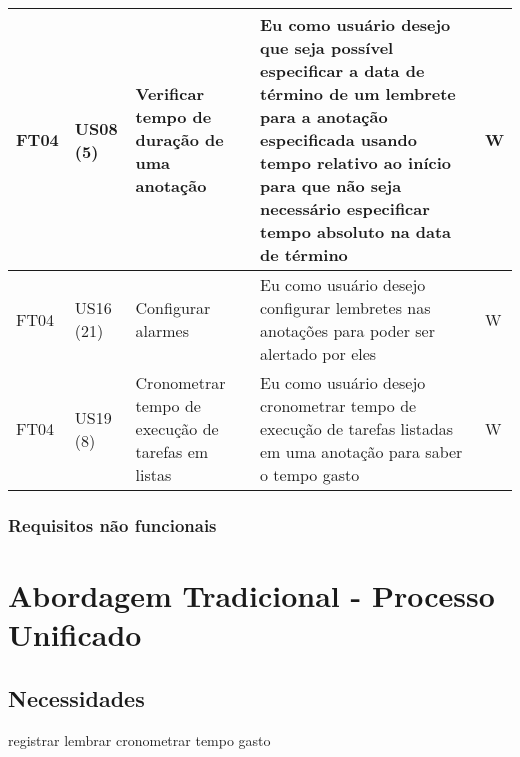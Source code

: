 \documentclass[
	12pt,				%
	oneside,			%
	a4paper,			%
	english,			%
	brazil,				%
	]{abntex2}
\begin{document}
\begin{longtable}{@{}p{}p{}p{}p{}p{}@{}}
FT04 & US08 (5) & Verificar tempo de duração de uma anotação & Eu como usuário desejo que seja possível especificar a data de término de um lembrete para a anotação especificada usando tempo relativo ao início para que não seja necessário especificar tempo absoluto na data de término & W\\ \midrule
FT04 & US16 (21) & Configurar alarmes & Eu como usuário desejo configurar lembretes nas anotações para poder ser alertado por eles & W\\ \midrule
FT04 & US19 (8) & Cronometrar tempo de execução de tarefas em listas & Eu como usuário desejo cronometrar tempo de execução de tarefas listadas em uma anotação para saber o tempo gasto & W\\ \bottomrule
\end{longtable}

\section{Requisitos não funcionais}
\begin{table}[ht]
\end{table}

\part{Abordagem Tradicional - Processo Unificado }



\chapter{Necessidades}

registrar
lembrar
cronometrar
tempo gasto
\end{document}

